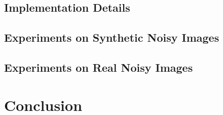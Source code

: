 \documentclass[10pt,twocolumn,letterpaper]{article}
\begin{document}
\subsection{Implementation Details}


\subsection{Experiments on Synthetic Noisy Images}



\subsection{Experiments on Real Noisy Images}



\section{Conclusion}



{
\small


}
\end{document}
